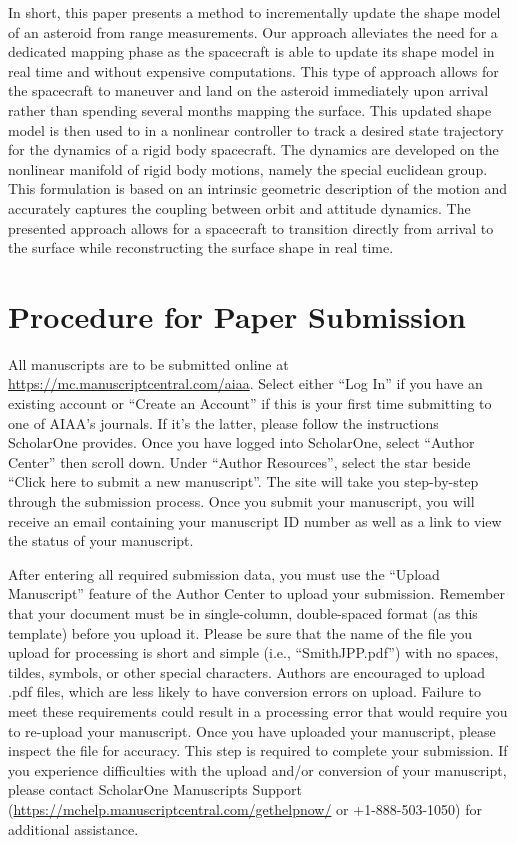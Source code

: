 \documentclass[journal]{new-aiaa}
\begin{document}
In short, this paper presents a method to incrementally update the shape  model of an asteroid from range measurements. 
Our approach alleviates the need for a dedicated mapping phase as the spacecraft is able to update its shape model in real time and without expensive computations.
This type of approach allows for the spacecraft to maneuver and land on the asteroid immediately upon arrival rather than spending several months mapping the surface.
This updated shape model is then used to in a nonlinear controller to track a desired state trajectory for the dynamics of a rigid body spacecraft.
The dynamics are developed on the nonlinear manifold of rigid body motions, namely the special euclidean group.
This formulation is based on an intrinsic geometric description of the motion and accurately captures the coupling between orbit and attitude dynamics. 
The presented approach allows for a spacecraft to transition directly from arrival to the surface while reconstructing the surface shape in real time.
\section{Procedure for Paper Submission}

All manuscripts are to be submitted online at \url{https://mc.manuscriptcentral.com/aiaa}. Select either “Log In” if you have an existing account or “Create an Account” if this is your first time submitting to one of AIAA’s journals. If it’s the latter, please follow the instructions ScholarOne provides. Once you have logged into ScholarOne, select “Author Center” then scroll down. Under “Author Resources”, select the star beside “Click here to submit a new manuscript”. The site will take you step-by-step through the submission process. Once you submit your manuscript, you will receive an email containing your manuscript ID number as well as a link to view the status of your manuscript. 

After entering all required submission data, you must use the “Upload Manuscript” feature of the Author Center to upload your submission. Remember that your document must be in single-column, double-spaced format (as this template) before you upload it. Please be sure that the name of the file you upload for processing is short and simple (i.e., “SmithJPP.pdf”) with no spaces, tildes, symbols, or other special characters. Authors are encouraged to upload .pdf files, which are less likely to have conversion errors on upload. Failure to meet these requirements could result in a processing error that would require you to re-upload your manuscript. Once you have uploaded your manuscript, please inspect the file for accuracy. This step is required to complete your submission. If you experience difficulties with the upload and/or conversion of your manuscript, please contact ScholarOne Manuscripts Support (\url{https://mchelp.manuscriptcentral.com/gethelpnow/} or +1-888-503-1050) for additional assistance. 
\end{document}
